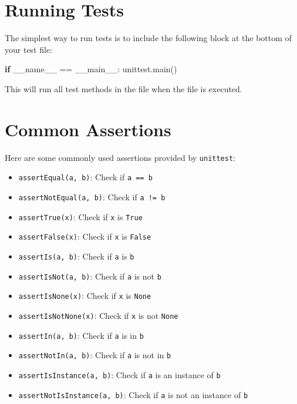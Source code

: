 \documentclass[
  letterpaper,
  DIV=11,
  numbers=noendperiod]{scrreprt}
\newenvironment{Shaded}{\begin{snugshade}}{\end{snugshade}}
\newcommand{\ControlFlowTok}[1]{\textcolor[rgb]{0.00,0.23,0.31}{\textbf{#1}}}
\newcommand{\NormalTok}[1]{\textcolor[rgb]{0.00,0.23,0.31}{#1}}
\newcommand{\OperatorTok}[1]{\textcolor[rgb]{0.37,0.37,0.37}{#1}}
\newcommand{\StringTok}[1]{\textcolor[rgb]{0.13,0.47,0.30}{#1}}
\newcommand{\VariableTok}[1]{\textcolor[rgb]{0.07,0.07,0.07}{#1}}
\providecommand{\tightlist}{%
  \setlength{\itemsep}{0pt}\setlength{\parskip}{0pt}}\usepackage{longtable,booktabs,array}
\begin{document}
\section{Running Tests}\label{running-tests-1}

The simplest way to run tests is to include the following block at the
bottom of your test file:

\begin{Shaded}
\begin{Highlighting}[]
\ControlFlowTok{if} \VariableTok{\_\_name\_\_} \OperatorTok{==} \StringTok{\textquotesingle{}\_\_main\_\_\textquotesingle{}}\NormalTok{:}
\NormalTok{    unittest.main()}
\end{Highlighting}
\end{Shaded}

This will run all test methods in the file when the file is executed.

\section{Common Assertions}\label{common-assertions}

Here are some commonly used assertions provided by \texttt{unittest}:

\begin{itemize}
\tightlist
\item
  \texttt{assertEqual(a,\ b)}: Check if \texttt{a\ ==\ b}
\item
  \texttt{assertNotEqual(a,\ b)}: Check if \texttt{a\ !=\ b}
\item
  \texttt{assertTrue(x)}: Check if \texttt{x} is \texttt{True}
\item
  \texttt{assertFalse(x)}: Check if \texttt{x} is \texttt{False}
\item
  \texttt{assertIs(a,\ b)}: Check if \texttt{a} is \texttt{b}
\item
  \texttt{assertIsNot(a,\ b)}: Check if \texttt{a} is not \texttt{b}
\item
  \texttt{assertIsNone(x)}: Check if \texttt{x} is \texttt{None}
\item
  \texttt{assertIsNotNone(x)}: Check if \texttt{x} is not \texttt{None}
\item
  \texttt{assertIn(a,\ b)}: Check if \texttt{a} is in \texttt{b}
\item
  \texttt{assertNotIn(a,\ b)}: Check if \texttt{a} is not in \texttt{b}
\item
  \texttt{assertIsInstance(a,\ b)}: Check if \texttt{a} is an instance
  of \texttt{b}
\item
  \texttt{assertNotIsInstance(a,\ b)}: Check if \texttt{a} is not an
  instance of \texttt{b}
\end{itemize}
\end{document}
